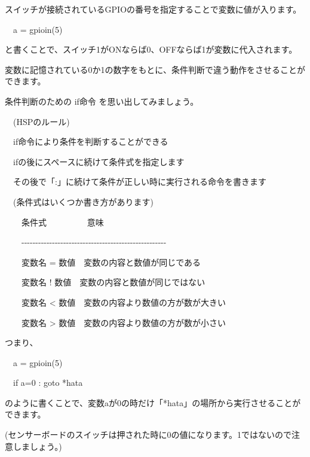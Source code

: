 \documentclass[a4paper,12pt]{jarticle}
\begin{document}
\bigskip
\bigskip
\bigskip

スイッチが接続されているGPIOの番号を指定することで変数に値が入ります。

\bigskip

\ \ a = gpioin(5)

\bigskip

と書くことで、スイッチ1がONならば0、OFFならば1が変数に代入されます。

変数に記憶されている0か1の数字をもとに、条件判断で違う動作をさせることができます。

条件判断のための if命令 を思い出してみましょう。

\bigskip
\bigskip
\bigskip

\ \ (HSPのルール)


\bigskip

\ \ if命令により条件を判断することができる

\ \ ifの後にスペースに続けて条件式を指定します

\ \ その後で「:」に続けて条件が正しい時に実行される命令を書きます


\bigskip

\ \ (条件式はいくつか書き方があります)


\bigskip

\ \ \ \ 条件式 \ \ \ \ \ \ \ \ \ 意味

\ \ \ \ {}-{}-{}-{}-{}-{}-{}-{}-{}-{}-{}-{}-{}-{}-{}-{}-{}-{}-{}-{}-{}-{}-{}-{}-{}-{}-{}-{}-{}-{}-{}-{}-{}-{}-{}-{}-{}-{}-{}-{}-{}-{}-{}-{}-{}-{}-{}-{}-{}-{}-{}-{}-

\ \ \ \ 変数名 =
数値\ \ 変数の内容と数値が同じである

\ \ \ \ 変数名 !
数値\ \ 変数の内容と数値が同じではない

\ \ \ \ 変数名 {\textless}
数値\ \ 変数の内容より数値の方が数が大きい

\ \ \ \ 変数名 {\textgreater}
数値\ \ 変数の内容より数値の方が数が小さい

\bigskip
\bigskip

つまり、

\bigskip

\ \ a = gpioin(5)

\ \ if a=0 : goto *hata

\bigskip

のように書くことで、変数aが0の時だけ「*hata」の場所から実行させることができます。

(センサーボードのスイッチは押された時に0の値になります。1ではないので注意しましょう。)


\bigskip
\bigskip
\end{document}
